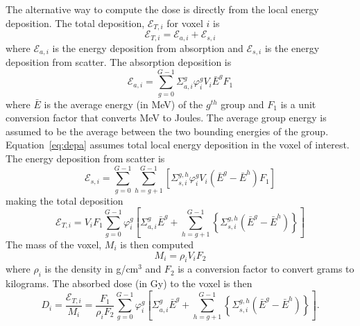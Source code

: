The alternative way to compute the dose is directly from the local energy deposition. The total deposition, $\mathcal{E}_{T,i}$ for voxel $i$ is
\begin{equation}\label{eq:dept}
\mathcal{E}_{T,i} = \mathcal{E}_{a,i} + \mathcal{E}_{s,i}
\end{equation} 
where $\mathcal{E}_{a,i}$ is the energy deposition from absorption and $\mathcal{E}_{s,i}$ is the energy deposition from scatter. The absorption deposition is
\begin{equation}\label{eq:depa}
\mathcal{E}_{a,i} = \sum_{g=0}^{G-1} \Sigma_{a,i}^g \varphi_i^g V_i \bar{E}^g F_1
\end{equation}
where $\bar{E}$ is the average energy (in MeV) of the $g^{th}$ group and $F_1$ is a unit conversion factor that converts MeV to Joules. The average group energy is assumed to be the average between the two bounding energies of the group. Equation~\ref{eq:depa} assumes total local energy deposition in the voxel of interest. The energy deposition from scatter is
\begin{equation}\label{eq:deps}
\mathcal{E}_{s,i} = \sum_{g=0}^{G-1} \sum_{h=g+1}^{G-1} \left[ \Sigma_{s,i}^{g,h} \varphi_i^g V_i (\bar{E}^g-\bar{E}^h) F_1 \right]
\end{equation}
making the total deposition
\begin{equation}\label{eq:dept2}
\mathcal{E}_{T,i} = V_i F_1 \sum_{g=0}^{G-1} \varphi_i^g \left[\Sigma_{a,i}^g \bar{E}^g + \sum_{h=g+1}^{G-1} \left\{ \Sigma_{s,i}^{g,h}  (\bar{E}^g-\bar{E}^h) \right\} \right]
\end{equation}
The mass of the voxel, $M_i$ is then computed
\begin{equation}
M_i = \rho_i V_i F_2
\end{equation}
where $\rho_i$ is the density in g/cm$^3$ and $F_2$ is a conversion factor to convert grams to kilograms. The absorbed dose (in Gy) to the voxel is then
\begin{equation}\label{eq:dosedep}
D_i = \frac{\mathcal{E}_{T,i}}{M_i} = \frac{F_1}{\rho_i F_2} \sum_{g=0}^{G-1} \varphi_i^g \left[\Sigma_{a,i}^g \bar{E}^g + \sum_{h=g+1}^{G-1} \left\{ \Sigma_{s,i}^{g,h}  (\bar{E}^g-\bar{E}^h) \right\} \right].
\end{equation}

\endinput
